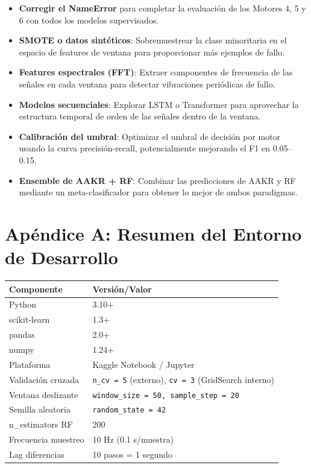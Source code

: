 \documentclass[12pt,a4paper]{article}
\begin{document}
\begin{itemize}[itemsep=3pt]
  \item \textbf{Corregir el NameError} para completar la evaluaci\'{o}n de los Motores
    4, 5 y 6 con todos los modelos supervisados.
  \item \textbf{SMOTE o datos sint\'{e}ticos}: Sobremuestrear la clase minoritaria en
    el espacio de features de ventana para proporcionar m\'{a}s ejemplos de fallo.
  \item \textbf{Features espectrales (FFT)}: Extraer componentes de frecuencia
    de las se\~{n}ales en cada ventana para detectar vibraciones peri\'{o}dicas de fallo.
  \item \textbf{Modelos secuenciales}: Explorar LSTM o Transformer para aprovechar la
    estructura temporal de orden de las se\~{n}ales dentro de la ventana.
  \item \textbf{Calibraci\'{o}n del umbral}: Optimizar el umbral de decisi\'{o}n por motor
    usando la curva precisi\'{o}n-recall, potencialmente mejorando el F1 en 0.05--0.15.
  \item \textbf{Ensemble de AAKR + RF}: Combinar las predicciones de AAKR y RF
    mediante un meta-clasificador para obtener lo mejor de ambos paradigmas.
\end{itemize}

\appendix
\section*{Ap\'{e}ndice A: Resumen del Entorno de Desarrollo}

\begin{center}
\begin{tabular}{ll}
\toprule
\textbf{Componente} & \textbf{Versi\'{o}n/Valor} \\
\midrule
Python              & 3.10+ \\
scikit-learn        & 1.3+ \\
pandas              & 2.0+ \\
numpy               & 1.24+ \\
Plataforma          & Kaggle Notebook / Jupyter \\
Validaci\'{o}n cruzada  & \texttt{n\_cv = 5} (externo), \texttt{cv = 3} (GridSearch interno) \\
Ventana deslizante  & \texttt{window\_size = 50, sample\_step = 20} \\
Semilla aleatoria   & \texttt{random\_state = 42} \\
n\_estimators RF    & 200 \\
Frecuencia muestreo & 10 Hz (0.1 s/muestra) \\
Lag diferencias     & 10 pasos = 1 segundo \\
\bottomrule
\end{tabular}
\end{center}
\end{document}
